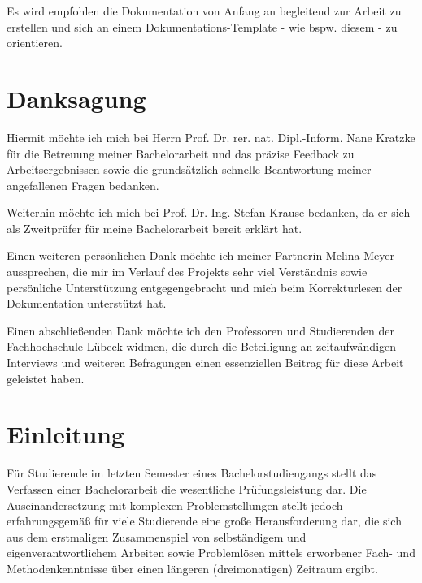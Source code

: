 \documentclass[bibliography=totoc,listof=totoc,BCOR=5mm,DIV=12,oneside]{scrbook}
\begin{document}
Es wird empfohlen die Dokumentation von Anfang an begleitend zur Arbeit zu erstellen und sich an einem Dokumentations-Template - wie bspw. diesem - zu orientieren.

\newpage


\newpage
\chapter*{Danksagung}
\par Hiermit möchte ich mich bei Herrn Prof. Dr. rer. nat. Dipl.-Inform. Nane Kratzke für die Betreuung meiner Bachelorarbeit und das präzise Feedback zu Arbeitsergebnissen sowie die grundsätzlich schnelle Beantwortung meiner angefallenen Fragen bedanken.

\par \bigskip Weiterhin möchte ich mich bei Prof. Dr.-Ing. Stefan Krause bedanken, da er sich als Zweitprüfer für meine Bachelorarbeit bereit erklärt hat.

\par \bigskip Einen weiteren persönlichen Dank möchte ich meiner Partnerin Melina Meyer aussprechen, die mir im Verlauf des Projekts sehr viel Verständnis sowie persönliche Unterstützung entgegengebracht und mich beim Korrekturlesen der Dokumentation unterstützt hat.

\par \bigskip Einen abschließenden Dank möchte ich den Professoren und Studierenden der Fachhochschule Lübeck widmen, die durch die Beteiligung an zeitaufwändigen Interviews und weiteren Befragungen einen essenziellen Beitrag für diese Arbeit geleistet haben.

\tableofcontents
\newpage
\mainmatter
\pagestyle{plain}

\chapter{Einleitung}
\par Für Studierende im letzten Semester eines Bachelorstudiengangs stellt das Verfassen einer Bachelorarbeit die wesentliche Prüfungsleistung dar. 
Die Auseinandersetzung mit komplexen Problemstellungen stellt jedoch erfahrungsgemäß für viele Studierende eine große Herausforderung dar, die sich aus dem erstmaligen Zusammenspiel von selbständigem und eigenverantwortlichem Arbeiten sowie Problemlösen mittels erworbener Fach- und Methodenkenntnisse über einen längeren (dreimonatigen) Zeitraum ergibt.
\end{document}
